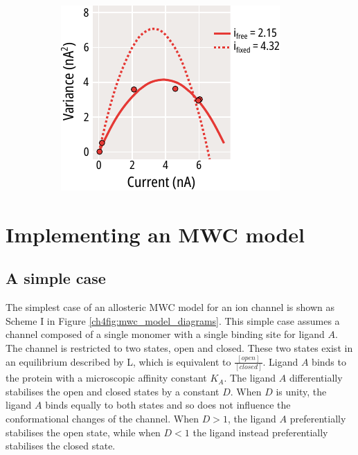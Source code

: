\begin{figure}[h]
\begin{subfigure}[t]{0.3\textwidth}
	\end{subfigure}
	\hfill
	\begin{subfigure}[t]{0.3\textwidth}
		\caption{}\label{ch4fig:noise_example_fits_3}
		\centering
		\includegraphics[width=\textwidth]{noise_example_fits_3.pdf}
	\end{subfigure}
	\caption[Systematic underestimation of i]{
	}\label{ch4fig:noise_manual}
\end{figure}

\section{Implementing an MWC model}

\subsection{A simple case}

The simplest case of an allosteric MWC model for an ion channel is shown as Scheme I in Figure \ref{ch4fig:mwc_model_diagrams}.
This simple case assumes a channel composed of a single monomer with a single binding site for ligand $A$.
The channel is restricted to two states, open and closed.
These two states exist in an equilibrium described by L, which is equivalent to $\frac{[open]}{[closed]}$.
Ligand $A$ binds to the protein with a microscopic affinity constant $K_A$.
The ligand $A$ differentially stabilises the open and closed states by a constant $D$.
When $D$ is unity, the ligand $A$ binds equally to both states and so does not influence the conformational changes of the channel.
When $D>1$, the ligand $A$ preferentially stabilises the open state, while when $D<1$ the ligand instead preferentially stabilises the closed state.


